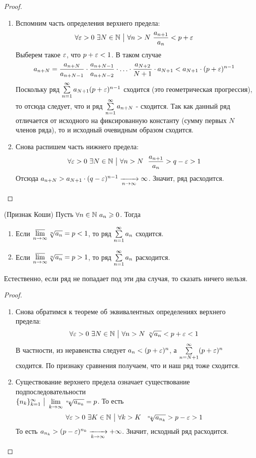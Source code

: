 \begin{proof}~
	\begin{enumerate}
		\item Вспомним часть определения верхнего предела:
		\[
			\forall \varepsilon > 0\ \exists N \in \mathbb{N} \ \big|\  \forall n > N\ \frac{a_{n + 1}}{a_n} < p + \varepsilon
		\]
		Выберем такое $\varepsilon$, что $p + \varepsilon < 1$. В таком случае
		\[
			a_{n + N} = \frac{a_{n + N}}{a_{n + N - 1}} \cdot \frac{a_{n + N - 1}}{a_{n + N - 2}} \cdot \ldots \cdot \frac{a_{N + 2}}{N + 1} \cdot a_{N + 1} < a_{N + 1} \cdot (p + \varepsilon)^{n - 1}
		\]
		Поскольку ряд $\sum\limits_{n = 1}^\infty a_{N + 1}(p + \varepsilon)^{n - 1}$ сходится (это геометрическая прогрессия), то отсюда следует, что и ряд $\sum\limits_{n = 1}^\infty a_{n + N}$ - сходится. Так как данный ряд отличается от исходного на фиксированную константу (сумму первых $N$ членов ряда), то и исходный очевидным образом сходится.
		
		\item Снова распишем часть нижнего предела:
		\[
			\forall \varepsilon > 0\ \exists N \in \mathbb{N} \ \big|\  \forall n > N\ \ \frac{a_{n + 1}}{a_n} > q - \varepsilon > 1
		\]
		Отсюда $a_{n + N} > a_{N + 1} \cdot (q - \varepsilon)^{n - 1} \xrightarrow[n \to \infty]{} \infty$. Значит, ряд расходится.
	\end{enumerate}
\end{proof}

\begin{theorem} (Признак Коши)
	Пусть $\forall n \in \mathbb{N}\ a_n \geqslant 0$. Тогда
	\begin{enumerate}
		\item Если $\varlimsup\limits_{n \to \infty} \sqrt[n]{a_n} = p < 1$, то ряд $\sum\limits_{n = 1}^\infty a_n$ сходится.
		
		\item Если $\varlimsup\limits_{n \to \infty} \sqrt[n]{a_n} = p > 1$, то ряд $\sum\limits_{n = 1}^\infty a_n$ расходится.
	\end{enumerate}
	Естественно, если ряд не попадает под эти два случая, то сказать ничего нельзя.
\end{theorem}

\begin{proof}~
	\begin{enumerate}
		\item Снова обратимся к теореме об эквивалентных определениях верхнего предела:
		\[
			\forall \varepsilon > 0\ \exists N \in \mathbb{N} \ \big|\  \forall n > N\ \sqrt[n]{a_n} < p + \varepsilon < 1
		\]
		В частности, из неравенства следует $a_n < (p + \varepsilon)^n$, а $\sum\limits_{n = N + 1}^\infty (p + \varepsilon)^n$ сходится. По признаку сравнения получаем, что и наш ряд тоже сходится.
		
		\item Существование верхнего предела означает существование подпоследовательности \\ $\{n_k\}_{k = 1}^\infty \ \big|\  \lim\limits_{k \to \infty} \sqrt[n_k]{a_{n_k}} = p$. То есть
		\[
			\forall \varepsilon > 0\ \exists K \in \mathbb{N} \ \big|\  \forall k > K\ \ \sqrt[n_k]{a_{n_k}} > p - \varepsilon > 1
		\]
		То есть $a_{n_k} > (p - \varepsilon)^{n_k} \xrightarrow[k \to \infty]{} +\infty$. Значит, исходный ряд расходится.
	\end{enumerate}
\end{proof}

